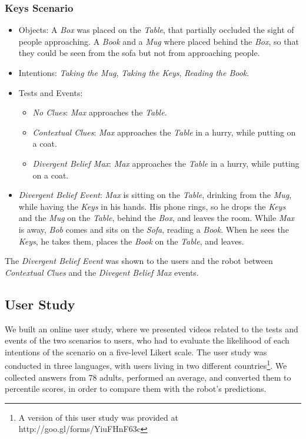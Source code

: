 \subsubsection{Keys Scenario}
\begin{itemize}
\item Objects: A \textit{Box} was placed on the \textit{Table}, that partially occluded the sight of people approaching. A \textit{Book} and a \textit{Mug} where placed behind the \textit{Box}, so that they could be seen from the sofa but not from approaching people.
\item Intentions: \textit{Taking the Mug}, \textit{Taking the Keys}, \textit{Reading the Book}.
\item Tests and Events:
\begin{itemize}
\item \textit{No Clues}: \textit{Max} approaches the \textit{Table}.
\item\textit{Contextual Clues}: \textit{Max} approaches the \textit{Table} in a hurry, while putting on a coat.
\item \textit{Divergent Belief Max}: \textit{Max} approaches the \textit{Table} in a hurry, while putting on a coat.
\end{itemize}
\item \textit{Divergent Belief Event}: \textit{Max} is sitting on the \textit{Table}, drinking from the \textit{Mug}, while having the \textit{Keys} in his hands. His phone rings, so he drops the \textit{Keys} and the \textit{Mug} on the \textit{Table}, behind the \textit{Box}, and leaves the room. While \textit{Max} is away, \textit{Bob} comes and sits on the \textit{Sofa}, reading a \textit{Book}. When he sees the \textit{Keys}, he takes them, places the \textit{Book} on the \textit{Table}, and leaves.
\end{itemize}

The \textit{Divergent Belief Event} was shown to the users and the robot between \textit{Contextual Clues} and the \textit{Divegent Belief Max} events.

\subsection{User Study}
We built an online user study, where we presented videos related to the tests and events of the two scenarios to users, who had to evaluate the likelihood of each intentions of the scenario
on a five-level Likert scale. The user study was conducted in three languages, with users living in two different countries\footnote{A version of this user study was provided at http://goo.gl/forms/YiuFHnF63c}. We collected answers from 78 adults, performed an average, and converted them to percentile scores, in order to compare them with the robot's predictions.

